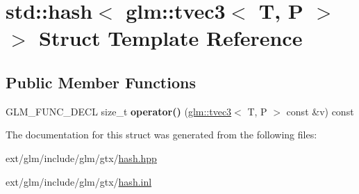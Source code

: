 \hypertarget{structstd_1_1hash_3_01glm_1_1tvec3_3_01_t_00_01_p_01_4_01_4}{\section{std\-:\-:hash$<$ glm\-:\-:tvec3$<$ T, P $>$ $>$ Struct Template Reference}
\label{structstd_1_1hash_3_01glm_1_1tvec3_3_01_t_00_01_p_01_4_01_4}
}
\subsection*{Public Member Functions}
\begin{DoxyCompactItemize}
\item 
\hypertarget{structstd_1_1hash_3_01glm_1_1tvec3_3_01_t_00_01_p_01_4_01_4_a1e603b3b68a06a664821d70aaeeff281}{G\-L\-M\-\_\-\-F\-U\-N\-C\-\_\-\-D\-E\-C\-L size\-\_\-t {\bfseries operator()} (\hyperlink{structglm_1_1tvec3}{glm\-::tvec3}$<$ T, P $>$ const \&v) const }\label{structstd_1_1hash_3_01glm_1_1tvec3_3_01_t_00_01_p_01_4_01_4_a1e603b3b68a06a664821d70aaeeff281}

\end{DoxyCompactItemize}


The documentation for this struct was generated from the following files\-:\begin{DoxyCompactItemize}
\item 
ext/glm/include/glm/gtx/\hyperlink{hash_8hpp}{hash.\-hpp}\item 
ext/glm/include/glm/gtx/\hyperlink{hash_8inl}{hash.\-inl}\end{DoxyCompactItemize}
